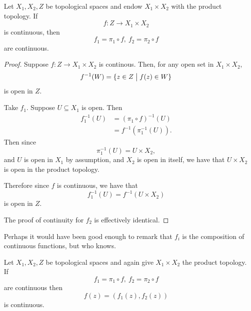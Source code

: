 \begin{lem*}
    Let $X_1,X_2,Z$ be topological spaces and 
    endow $X_1 \times X_2$ with the product topology. If 
    \[
        f : Z \to X_1 \times X_2
    \]
    is continuous, then 
    \[
        f_1 = \pi_1 \circ f, \ f_2 = \pi_2 \circ f
    \]
    are continuous. 
\end{lem*}
\begin{proof}
    Suppose $f : Z \to X_1 \times X_2$ is continous. 
    Then, for any open set 
    in $X_1 \times X_2$, 
    \[
        f^{-1}(W) = \{z \in Z \bigm| f(z) \in W\}
    \]
    is open in $Z$. 

    Take $f_1$. Suppose $U \subseteq X_1$ is open. Then 
    \begin{align*}
        f_1^{-1}(U) &= (\pi_1 \circ f)^{-1}(U) \\ 
                    &= f^{-1}(\pi_1^{-1}(U)). 
    \end{align*}
    Then since 
    \[
        \pi_1^{-1}(U) = U \times X_2,
    \]
    and $U$ is open in $X_1$ by assumption, and $X_2$ is 
    open in itself, we have that $U \times X_2$ is open 
    in the product topology. 

    Therefore since $f$ is continuous, we have that 
    \[
        f_1^{-1}(U) = f^{-1}(U\times X_2) 
    \]
    is open in $Z$. 

    The proof of continuity for $f_2$ is effectively identical. 
\end{proof}
Perhaps it would have been good enough to remark that 
$f_i$ is the composition of continuous functions, but who knows. 
\begin{lem*}
    Let $X_1,X_2,Z$ be topological spaces and again 
    give $X_1\times X_2$ the product topology. If 
    \[
        f_1 = \pi_1 \circ f, \ f_2 = \pi_2 \circ f
    \]
    are continuous then 
    \[
        f(z) = (f_1(z), f_2(z))
    \]
    is continuous. 
\end{lem*}
